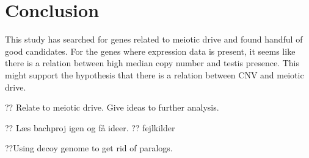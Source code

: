 \section*{Conclusion}


This study has searched for genes related to meiotic drive and found handful of good candidates. For the genes where expression data is present, it seems like there is a relation between high median copy number and testis presence. This might support the hypothesis that there is a relation between CNV and meiotic drive.


?? Relate to meiotic drive. Give ideas to further analysis.

?? Læs bachproj igen og få ideer.
?? fejlkilder






??Using decoy genome to get rid of paralogs.


